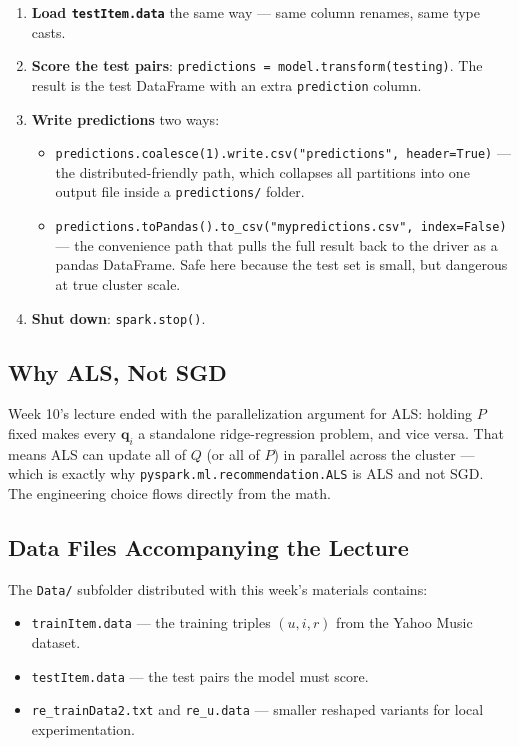 \documentclass[11pt]{article}
\begin{document}
\begin{enumerate}
    \item \textbf{Load \texttt{testItem.data}} the same way --- same column renames, same type casts.
    \item \textbf{Score the test pairs}: \texttt{predictions = model.transform(testing)}. The result is the test DataFrame with an extra \texttt{prediction} column.
    \item \textbf{Write predictions} two ways:
    \begin{itemize}
        \item \texttt{predictions.coalesce(1).write.csv("predictions", header=True)} --- the distributed-friendly path, which collapses all partitions into one output file inside a \texttt{predictions/} folder.
        \item \texttt{predictions.toPandas().to\_csv("mypredictions.csv", index=False)} --- the convenience path that pulls the full result back to the driver as a pandas DataFrame. Safe here because the test set is small, but dangerous at true cluster scale.
    \end{itemize}
    \item \textbf{Shut down}: \texttt{spark.stop()}.
\end{enumerate}

\subsection{Why ALS, Not SGD}
Week 10's lecture ended with the parallelization argument for ALS: holding $P$ fixed makes every $\mathbf{q}_i$ a standalone ridge-regression problem, and vice versa. That means ALS can update all of $Q$ (or all of $P$) in parallel across the cluster --- which is exactly why \texttt{pyspark.ml.recommendation.ALS} is ALS and not SGD. The engineering choice flows directly from the math.

\subsection{Data Files Accompanying the Lecture}
The \texttt{Data/} subfolder distributed with this week's materials contains:
\begin{itemize}
    \item \texttt{trainItem.data} --- the training triples $(u, i, r)$ from the Yahoo Music dataset.
    \item \texttt{testItem.data} --- the test pairs the model must score.
    \item \texttt{re\_trainData2.txt} and \texttt{re\_u.data} --- smaller reshaped variants for local experimentation.
\end{itemize}
\end{document}
